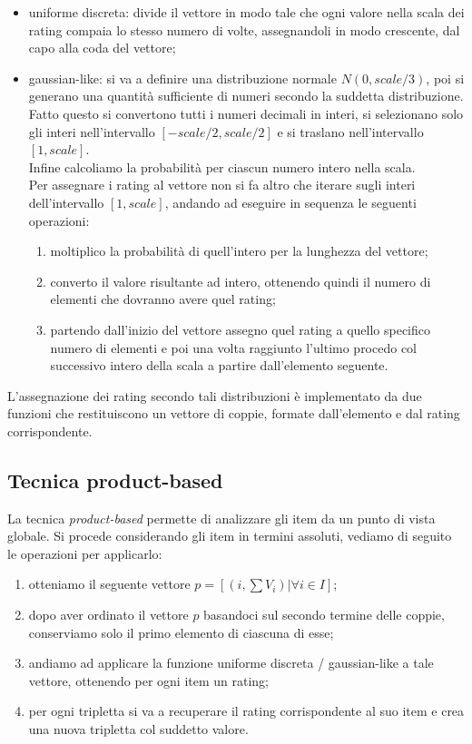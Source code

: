 \begin{itemize}
    \item uniforme discreta: divide il vettore in modo tale che ogni valore nella scala dei rating compaia lo stesso numero di volte, assegnandoli in modo crescente, dal capo alla coda del vettore;
    \item gaussian-like: si va a definire una distribuzione normale $N(0,scale/3)$, poi si generano una quantità sufficiente di numeri secondo la suddetta distribuzione. Fatto questo si convertono tutti i numeri decimali in interi, si selezionano solo gli interi nell'intervallo $[-scale/2,scale/2]$ e si traslano nell'intervallo $[1,scale]$.\\
    Infine calcoliamo la probabilità per ciascun numero intero nella scala.\\
    Per assegnare i rating al vettore non si fa altro che iterare sugli interi dell'intervallo $[1,scale]$, andando ad eseguire in sequenza le seguenti operazioni:
    \begin{enumerate}
        \item moltiplico la probabilità di quell'intero per la lunghezza del vettore;
        \item converto il valore risultante ad intero, ottenendo quindi il numero di elementi che dovranno avere quel rating;
        \item partendo dall'inizio del vettore assegno quel rating a quello specifico numero di elementi e poi una volta raggiunto l'ultimo procedo col successivo intero della scala a partire dall'elemento seguente.
    \end{enumerate}
\end{itemize}
L'assegnazione dei rating secondo tali distribuzioni è implementato da due funzioni che restituiscono un vettore di coppie, formate dall'elemento e dal rating corrispondente.

\subsection{Tecnica product-based}
La tecnica \textit{product-based} permette di analizzare gli item da un punto di vista globale. Si procede considerando gli item in termini assoluti, vediamo di seguito le operazioni per applicarlo:
\begin{enumerate}
    \item otteniamo il seguente vettore $p = [(i,\sum V_i)| \forall i \in I]$;
    \item dopo aver ordinato il vettore $p$ basandoci sul secondo termine delle coppie, conserviamo solo il primo elemento di ciascuna di esse;
    \item andiamo ad applicare la funzione uniforme discreta / gaussian-like a tale vettore, ottenendo per ogni item un rating;
    \item per ogni tripletta si va a recuperare il rating corrispondente al suo item e crea una nuova tripletta col suddetto valore.  
\end{enumerate}

